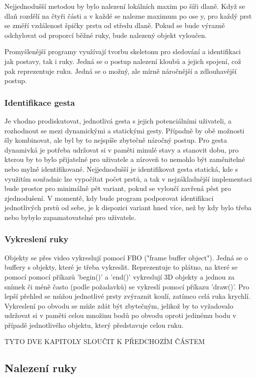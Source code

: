 Nejjednodušší metodou by bylo nalezení lokálních maxim po šíři dlaně. Když se dlaň rozdělí na čtyři části a v každé se nalezne maximum po ose y, pro každý prst se změří vzdálenost špičky prstu od středu dlaně. Pokud se bude výrazně odchylovat od proporcí běžné ruky, bude nalezený objekt vyloučen.

Promyšlenější programy využívají tvorbu skeletonu pro sledování a identifikaci jak postavy, tak i ruky. Jedná se o postup nalezení kloubů a jejich spojení, což pak reprezentuje ruku. Jedná se o možný, ale mírně náročnější a zdlouhavější postup.


\subsubsection{Identifikace gesta}
Je vhodno prodiskutovat, jednotlivá gesta s jejich potenciálními uživateli, a rozhodnout se mezi dynamickými a statickými gesty. Případně by obě možnosti šly kombinovat, ale byl by to nejspíše zbytečně náročný postup. Pro gesta dynamivká je potřeba udržovat si v paměti minulé stavy a stanovit dobu, pro kterou by to bylo přijatelné pro uživatele a zároveň to nemohlo být zaměnitelné nebo mylně identifikované. Nejjednodušší je identifikovat gesta statická, kde s využitím souřadnic lze vypočítat počet prstů, a tak v nejzákladnější implementaci bude prostor pro minimálně pět variant, pokud se vyloučí zavřená pěst pro zjednodušení. V momentě, kdy bude program podporovat identifikaci jednotlivých prstů od sebe, je k dispozici variant hned více, než by kdy bylo třeba nebo bybylo zapamatovatelné pro uživatele.

\subsubsection{Vykreslení ruky}
Objekty se přes video vykreslují pomocí FBO ("frame buffer object"). Jedná se o buffery s objekty, které je třeba vykreslit. Reprezentuje to plátno, na které se pomocí pomocí příkazů 'begin()' a 'end()' vykreslují 3D objekty a jednou za snímek či méně často (podle požadavků) se vykreslí pomocí příkazu 'draw()'. Pro lepší přehled se můžou jednotlivé prsty zvýraznit koulí, zatímco celá ruka krychlí. Vykreslení po obvodu se může zdát být zbytečným, jelikož by to vyžadovalo udržovat si v paměti celou množinu bodů po obvodu oproti jedinému bodu v případě jednotlivého objektu, který představuje celou ruku. 

TYTO DVE KAPITOLY SLOUČIT K PŘEDCHOZÍM ČÁSTEM
\subsection{Nalezení ruky}


